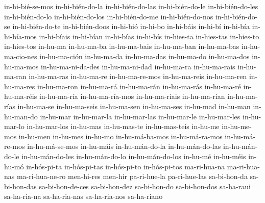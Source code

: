 {in-hi-bié-se-mos
in-hi-bién-do-la
in-hi-bién-do-las
in-hi-bién-do-le
in-hi-bién-do-les
in-hi-bién-do-lo
in-hi-bién-do-los
in-hi-bién-do-me
in-hi-bién-do-nos
in-hi-bién-do-se
in-hi-bién-do-te
in-hi-bién-doos
in-hi-bió
in-hi-bo
in-hi-báis
in-hi-bí
in-hi-bía
in-hi-bía-mos
in-hi-bíais
in-hi-bían
in-hi-bías
in-hi-bís
in-hies-ta
in-hies-tas
in-hies-to
in-hies-tos
in-hu-ma
in-hu-ma-ba
in-hu-ma-bais
in-hu-ma-ban
in-hu-ma-bas
in-hu-ma-cio-nes
in-hu-ma-ción
in-hu-ma-da
in-hu-ma-das
in-hu-ma-do
in-hu-ma-dos
in-hu-ma-mos
in-hu-ma-ni-da-des
in-hu-ma-ni-dad
in-hu-ma-ra
in-hu-ma-rais
in-hu-ma-ran
in-hu-ma-ras
in-hu-ma-re
in-hu-ma-re-mos
in-hu-ma-reis
in-hu-ma-ren
in-hu-ma-res
in-hu-ma-ron
in-hu-ma-rá
in-hu-ma-rán
in-hu-ma-rás
in-hu-ma-ré
in-hu-ma-réis
in-hu-ma-ría
in-hu-ma-ría-mos
in-hu-ma-ríais
in-hu-ma-rían
in-hu-ma-rías
in-hu-ma-se
in-hu-ma-seis
in-hu-ma-sen
in-hu-ma-ses
in-hu-mad
in-hu-man
in-hu-man-do
in-hu-mar
in-hu-mar-la
in-hu-mar-las
in-hu-mar-le
in-hu-mar-les
in-hu-mar-lo
in-hu-mar-los
in-hu-mas
in-hu-mas-te
in-hu-mas-teis
in-hu-me
in-hu-me-mos
in-hu-men
in-hu-mes
in-hu-mo
in-hu-má-ba-mos
in-hu-má-ra-mos
in-hu-má-re-mos
in-hu-má-se-mos
in-hu-máis
in-hu-mán-do-la
in-hu-mán-do-las
in-hu-mán-do-le
in-hu-mán-do-les
in-hu-mán-do-lo
in-hu-mán-do-los
in-hu-mé
in-hu-méis
in-hu-mó
in-hós-pi-ta
in-hós-pi-tas
in-hós-pi-to
in-hós-pi-tos
ma-ri-hua-na         
ma-ri-hua-nas        
ma-ri-hua-ne-ro             
men-hi-res
men-hir
pa-ri-hue-la          
pa-ri-hue-las         
sa-bi-hon-da         
sa-bi-hon-das        
sa-bi-hon-de-ces     
sa-bi-hon-dez        
sa-bi-hon-do         
sa-bi-hon-dos        
sa-ha-raui           
sa-ha-ria-na         
sa-ha-ria-nas        
sa-ha-ria-nos         
sa-ha-riano}